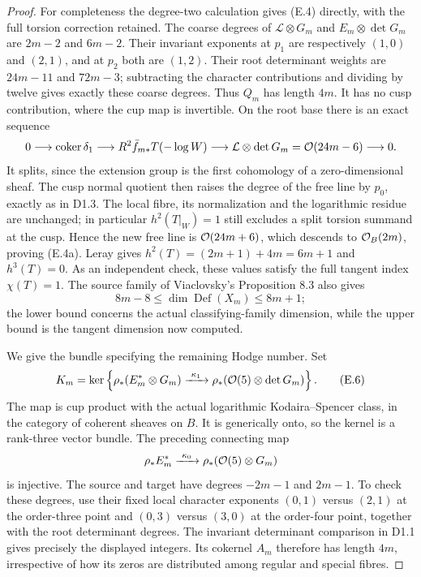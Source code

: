 \begin{proof}
For completeness the degree-two calculation gives (E.4) directly,
with the full torsion correction retained. The coarse degrees of
$\mathcal L\otimes G_m$ and $E_m\otimes\det G_m$ are $2m-2$
and $6m-2$. Their invariant exponents at $p_1$ are respectively
$(1,0)$ and $(2,1)$, and at $p_2$ both are $(1,2)$.
Their root determinant weights are $24m-11$ and $72m-3$;
subtracting the character contributions and dividing by twelve
gives exactly these coarse degrees. Thus $Q_m$ has length $4m$.
It has no cusp contribution, where the cup map is invertible.
On the root base there is an exact sequence
\[
 0\longrightarrow\operatorname{coker}\delta_1
 \longrightarrow R^2\bar f_{m*}T(-\log W)
 \longrightarrow\mathcal L\otimes\det G_m
                 =\mathcal O(24m-6)\longrightarrow0.
\]
It splits, since the extension group is the first cohomology of a
zero-dimensional sheaf. The cusp normal quotient then raises the
degree of the free line by $p_0$, exactly as in D1.3. The local
fibre, its normalization and the logarithmic residue are unchanged;
in particular $h^2(T|_W)=1$ still excludes a split torsion summand at
the cusp. Hence the new free line is $\mathcal O(24m+6)$, which descends to
$\mathcal O_B(2m)$, proving (E.4a). Leray gives
$h^2(T)=(2m+1)+4m=6m+1$ and $h^3(T)=0$.
As an independent check, these values satisfy the full tangent
index $\chi(T)=1$. The source family of Viaclovsky's Proposition 8.3
also gives
\[
 8m-8\le\dim\operatorname{Def}(X_m)\le8m+1;
\]
the lower bound concerns the actual classifying-family dimension,
while the upper bound is the tangent dimension now computed.

We give the bundle specifying the remaining Hodge number. Set
\[
 K_m=\ker\left\{\rho_*(E_m^*\otimes G_m)
  \xrightarrow{\ \kappa_1\ }
       \rho_*(\mathcal O(5)\otimes\det G_m)\right\}.         \tag{E.6}
\]
The map is cup product with the actual logarithmic
Kodaira--Spencer class, in the category of coherent sheaves on $B$.
It is generically onto, so the kernel is a rank-three vector bundle.
The preceding connecting map
\[
 \rho_*E_m^*\xrightarrow{\ \kappa_0\ }
                 \rho_*(\mathcal O(5)\otimes G_m)
\]
is injective. The source and target have degrees $-2m-1$ and
$2m-1$. To check these degrees, use their fixed local character
exponents $(0,1)$ versus $(2,1)$ at the order-three point and
$(0,3)$ versus $(3,0)$ at the order-four point, together with the
root determinant degrees. The invariant determinant comparison in
D1.1 gives precisely the displayed integers. Its cokernel $A_m$
therefore has length $4m$, irrespective of how its zeros are
distributed among regular and special fibres.


\end{proof}

